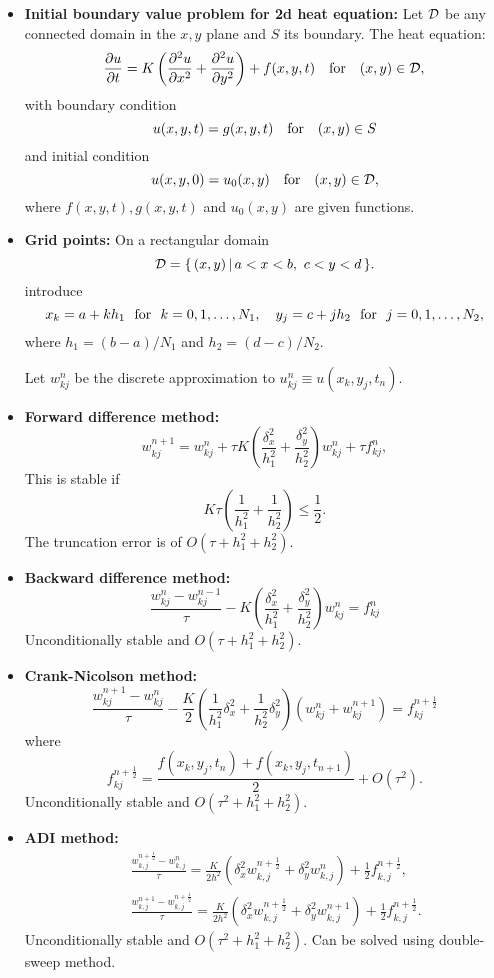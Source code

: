 \documentclass[12pt]{article}
\begin{document}
\begin{itemize}

\item \textbf{Initial boundary value problem for 2d heat equation:}
Let ${\cal D}$ be any connected  domain in the $x,y$ plane and $S$ its boundary.
The heat equation:
\[
\frac{\partial u}{\partial t}=K\left(\frac{\partial^{2}u}{\partial
x^{2}} +\frac{\partial^{2}u}{\partial y^{2}}\right)+f(x,y,t)  \quad {\rm for} \quad (x,y)\in{\cal D},
\]
with boundary condition
\[
u(x,y,t) = g(x,y,t) \quad \hbox{for} \quad (x,y)\in S 
\]
and initial condition
\[
u(x, y, 0) = u_{0}(x, y)  \quad {\rm for} \quad (x,y)\in{\cal D},
\]
where $f(x,y,t), g(x, y, t)$ and $ u_{0}(x, y)$ are given functions.

\item {\bf Grid points:}
On a rectangular domain
\[
{\cal D}=\{\, (x,y)\, \vert \,  a<x<b, \ c<y<d \, \}.
\]
introduce
\[
x_{k}=a+kh_{1} \ \ {\rm for} \ \ k=0,1,\dots,N_{1}, \quad
y_{j}=c+jh_{2} \ \ {\rm for} \ \ j=0,1,\dots,N_{2},
\]
where $h_{1}=(b-a)/N_{1}$ and $h_{2}=(d-c)/N_{2}$.

Let $w_{kj}^{n}$ be the discrete approximation to
$u_{kj}^n\equiv u(x_{k},y_{j},t_{n})$. 

\item \textbf{Forward difference method:}
\[
w_{kj}^{n+1} =w_{kj}^{n}+\tau K\left(\frac{\delta_{x}^2}{h_{1}^2}
+\frac{\delta_{y}^2}{h_{2}^2}\right)w_{kj}^{n}+\tau f_{kj}^n,
\]
This is stable if
\[
K\tau
\left(\frac{1}{h_{1}^2}+\frac{1}{h_{2}^2}\right)\leq\frac{1}{2}. 
\]
The truncation error is of $O(\tau+h_1^2+h_2^2)$.

\item \textbf{Backward difference method:}
\[
\frac{w_{kj}^{n}-w_{kj}^{n-1}}{\tau} -K\left(
\frac{\delta_{x}^2}{h_{1}^2}+\frac{\delta_{y}^2}{h_{2}^2}\right)w_{kj}^{n}=f_{kj}^n
\]
Unconditionally stable and $O(\tau+h_1^2+h_2^2)$.

\item \textbf{Crank-Nicolson method:}
\[
\frac{w_{kj}^{n+1}-w_{kj}^{n}}{\tau} -\frac{K}{2}
\left(\frac{1}{h_{1}^2}
\delta_{x}^2+\frac{1}{h_{2}^2}\delta_{y}^2\right)
\left(w_{kj}^{n}+w_{kj}^{n+1}\right)=f_{kj}^{n+\frac{1}{2}}
\]
where
\[
f_{kj}^{n+\frac{1}{2}}=\frac{f(x_{k},y_{j},t_{n})+f(x_{k},y_{j},t_{n+1})}{2}+O(\tau^2).
\]
Unconditionally stable and $O(\tau^2+h_1^2+h_2^2)$.

\item \textbf{ADI method:}
\begin{eqnarray*}
&&\frac{w^{n+\frac{1}{2}}_{k,j}-w^{n}_{k,j}}{\tau}=\frac{K}{2h^2}
\left(\delta^2_{x}w^{n+\frac{1}{2}}_{k,j}
+\delta^2_{y}w^{n}_{k,j}\right)+\frac{1}{2}f^{n+\frac{1}{2}}_{k,j}, \label{f12} \\
&&\frac{w^{n+1}_{k,j}-w^{n+\frac{1}{2}}_{k,j}}{\tau}=\frac{K}{2h^2}
\left(\delta^2_{x}w^{n+\frac{1}{2}}_{k,j}
+\delta^2_{y}w^{n+1}_{k,j}\right)+\frac{1}{2}f^{n+\frac{1}{2}}_{k,j}. \label{f13}
\end{eqnarray*}
Unconditionally stable and $O(\tau^2+h_1^2+h_2^2)$. Can be solved using
double-sweep method.

\end{itemize}
\end{document}
